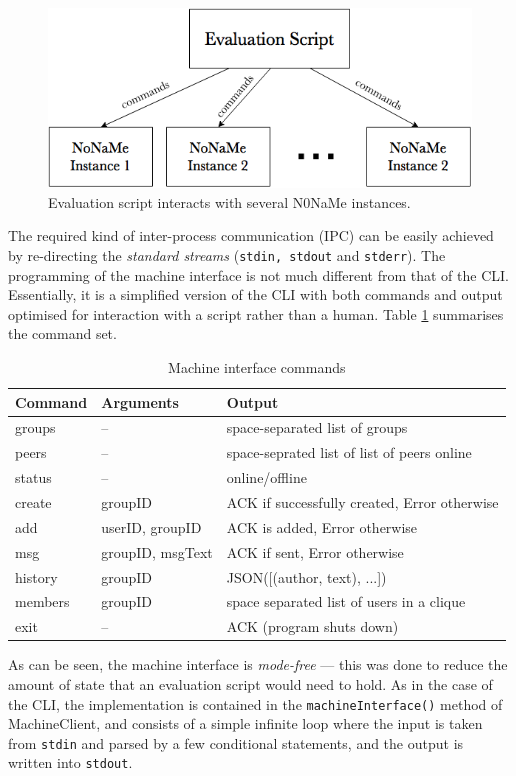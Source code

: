 \documentclass[a4paper, twoside, 12pt]{report}
\newcommand{\funkytt}{\fontfamily{AnonymousPro}\selectfont}
\begin{document}
\begin{figure}[H]
    \captionsetup{width=0.84\textwidth}
    \centering
    \includegraphics[width=0.76\linewidth]{pics/eval_script.png}
    \caption{\label{fig:eval_script} Evaluation script interacts with several {\funkytt N0NaMe} instances.}
\end{figure}

The required kind of inter-process communication (IPC) can be easily achieved by re-directing the \emph{standard streams} (\texttt{stdin, stdout} and \texttt{stderr}). The programming of the machine interface is not much different from that of the CLI. Essentially, it is a simplified version of the CLI with both commands and output optimised for interaction with a script rather than a human. Table \ref{tab:MachineInterface} summarises the command set.

\begin{table}[H]
\centering
\begin{tabular*}{0.95\textwidth}{l | l | l}
    Command & Arguments & Output \\
    \hline
    groups & -- & space-separated list of groups \\
    peers & -- & space-seprated list of list of peers online \\
    status & -- & online/offline \\
    create & groupID & ACK if successfully created, Error otherwise \\
    add & userID, groupID & ACK is added, Error otherwise \\
    msg & groupID, msgText & ACK if sent, Error otherwise \\
    history & groupID & JSON([(author, text), ...]) \\
    members & groupID & space separated list of users in a clique \\
    exit & -- & ACK (program shuts down)
\end{tabular*}
\caption{\label{tab:MachineInterface} Machine interface commands}
\end{table}
As can be seen, the machine interface is \emph{mode-free} --- this was done to reduce the amount of state that an evaluation script would need to hold. As in the case of the CLI, the implementation is contained in the \texttt{machineInterface()} method of MachineClient, and consists of a simple infinite loop where the input is taken from \texttt{stdin} and parsed by a few conditional statements, and the output is written into \texttt{stdout}.
\end{document}

